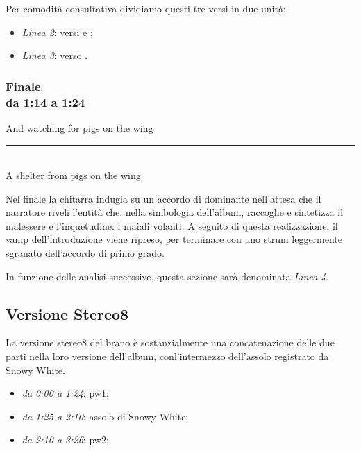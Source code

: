 \documentclass[class=book, crop=false, oneside, 12pt]{standalone}
\begin{document}
    Per comodità consultativa dividiamo questi tre versi in due unità: 
    \begin{itemize}
        \item \emph{Linea 2}: versi  e ;
        \item \emph{Linea 3}: verso .
    \end{itemize}
        
        
    \subsubsection*{Finale\\ \small{da 1:14 a 1:24}}
    \begin{displayquote}
        And watching for pigs on the wing \\
        \vspace{0pt}
        \rule{.4\linewidth}{.5pt} \\ %
        A shelter from pigs on the wing 
    \end{displayquote}
    Nel finale la chitarra indugia su un accordo di dominante nell'attesa che il narratore riveli l'entità che, nella simbologia dell'album, raccoglie e sintetizza il malessere e l'inquetudine: i maiali volanti. A seguito di questa realizzazione, il vamp dell'introduzione viene ripreso, per terminare con uno strum leggermente sgranato dell'accordo di primo grado.
    
    In funzione delle analisi successive, questa sezione sarà denominata \emph{Linea 4}.

    \subsection{Versione Stereo8}
    La versione stereo8 del brano è sostanzialmente una concatenazione delle due parti nella loro versione dell'album, conl'intermezzo dell'assolo registrato da Snowy White. 

    \begin{itemize}
        \item \emph{da 0:00 a 1:24}: \acrlong{pw1};
        \item \emph{da 1:25 a 2:10}: assolo di Snowy White;
        \item \emph{da 2:10 a 3:26}: \acrlong{pw2};
    \end{itemize}
\end{document}
